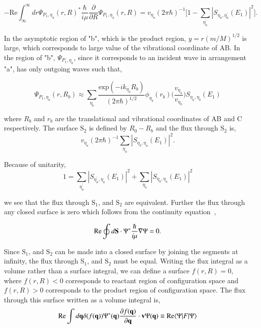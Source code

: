 \documentclass[phd,tocprelim]{cornell}
\begin{document}
\begin{equation}
-\textrm{Re} \int_{\infty}^{\infty} dr \Psi_{P_1, \eta_a}(r,R)^{*} \frac{\hbar}{i\mu}\frac{\partial}{\partial R} \Psi_{P_1, \eta_a}(r,R)= 
v_{\eta_a} (2 \pi \hbar)^{-1} \bigg[ 1- \sum_{\eta_a^{'}} |S_{\eta_a, \eta_a^{'}}(E_1)|^2 \bigg]. 
\end{equation}

In the asymptotic region of "b", which is the product region, $y= r(m/M)^{1/2}$ is large, which corresponds to large value of the vibrational coordinate of AB. In the region of "b",  $\Psi_{P_1,\eta_a}$, since it corresponds to an incident wave in arrangement "a",  has only outgoing waves such that, 

\begin{equation}
\Psi_{P_1, \eta_a}(r,R_b) \approx  \sum_{\eta_b}\frac{\textrm{exp}(-ik_{\eta_b}R_b) }{(2\pi \hbar)^{1/2}} \phi_{\eta_b}(r_b) \bigg(\frac{v_{\eta_a}}{v_{\eta_b}} \bigg) S_{\eta_a, \eta_b}(E_1)
\end{equation}

where $R_b$ and $r_b$ are the translational and vibrational coordinates of AB and C respectively. The surface $\textrm{S}_2$ is defined by $R_0-R_b$ and the flux through  $\textrm{S}_2$ is, 
\begin{equation}
v_{\eta_a} (2\pi \hbar)^{-1} \sum_{\eta_a} |S_{\eta_b, \eta_a}(E_1)|^2.
\end{equation}

Because of unitarity, 
\begin{equation}
1= \sum_{\eta_a^{'}} |S_{\eta_a^{'}, \eta_a}(E_1)|^2 + \sum_{\eta_b} |S_{\eta_b, \eta_a}(E_1)|^2 
\end{equation}

we see that the flux through $\textrm{S}_1$, and $\textrm{S}_2$ are equivalent. Further the flux through any closed surface is zero which follows from the continuity equation~\cite{LSCHIFF1968},

\begin{equation}
\textrm{Re} \oint d{\bf{S}} \cdot \Psi^{*} \frac{\hbar}{i\mu} \nabla \Psi = 0. 
\end{equation}

Since $\textrm{S}_1$, and $\textrm{S}_2$  can be made into a closed surface by joining the segments at infinity, the flux through $\textrm{S}_1$, and $\textrm{S}_2$ must be equal. Writing the flux integral as a volume rather than a surface integral, we can define a surface $f(r,R) =0$, where $f(r,R)<0$ corresponds to reactant region of configuration space and $f(r,R)>0$ corresponds to the product region of configuration space. The flux through this surface written as a volume integral is, 
\begin{equation}
\textrm{Re} \int d {\bf{q}} \delta ( f({\bf{q}})) \Psi^{*}({\bf{q}}) \frac{\partial f({\bf{q}})}{\partial {\bf{q}}} \cdot {\bf{v}} \Psi ({\bf{q}}) \equiv \textrm{Re} \langle \Psi | F |\Psi \rangle
\end{equation}
\end{document}
